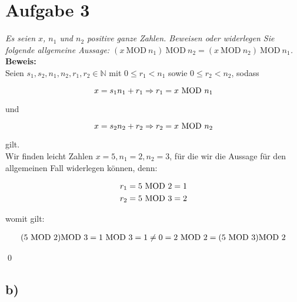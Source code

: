 \chapter{Aufgabe 3}

\textit{Es seien $x$, $n_1$ und $n_2$ positive ganze Zahlen. Beweisen oder widerlegen Sie
folgende allgemeine Aussage: $(x \ \text{MOD} \ n_1) \ \text{MOD} \ n_2 = (x \ \text{MOD} \ n_2) \ \text{MOD} \ n_1$.}\\

\noindent
\textbf{Beweis:}\\

\noindent
Seien $s_1, s_2, n_1, n_2, r_1, r_2 \in \mathbb{N}$ mit $0 \leq r_1 < n_1$ sowie $0 \leq r_2 < n_2$, sodass

\begin{equation}\notag
x = s_1 n_1 + r_1 \Rightarrow r_1 = x \ \text{MOD} \ n_1
\end{equation}

\noindent
und

\begin{equation}\notag
x = s_2 n_2 + r_2 \Rightarrow r_2 = x \ \text{MOD} \ n_2
\end{equation}

\noindent
gilt.\\

\noindent
Wir finden leicht Zahlen $x = 5, n_1 = 2, n_2 = 3$, für die wir die Aussage für den allgemeinen Fall widerlegen können, denn:

\begin{equation}\notag
\begin{split}
    r_1 &= 5 \ \text{MOD} \ 2 = 1\\
    r_2 &= 5 \ \text{MOD} \ 3 = 2
\end{split}
\end{equation}

\noindent
womit gilt:

\begin{equation}\notag
\begin{split}
(5 \ \text{MOD} \ 2) \text{MOD} \ 3  = 1 \ \text{MOD} \ 3 = 1 \neq 0 = 2 \ \text{MOD} \ 2 = (5 \ \text{MOD} \ 3) \text{MOD} \ 2
\end{split}
\end{equation}

\qed

\section{b)}

